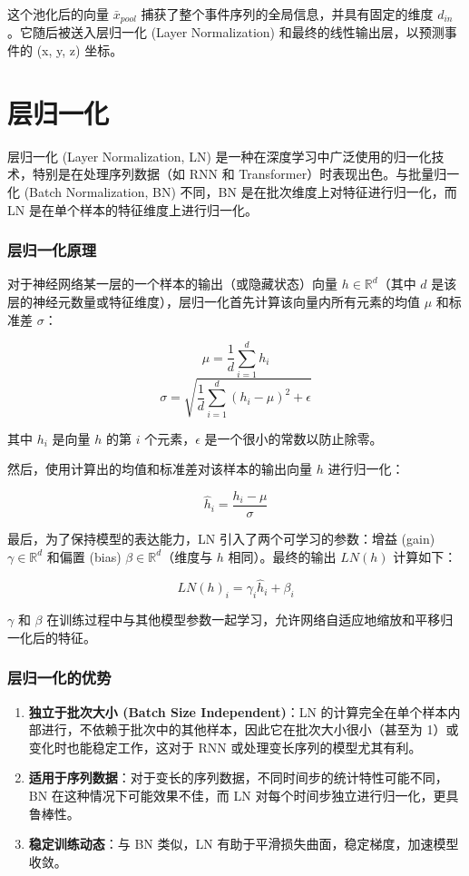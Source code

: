 这个池化后的向量 $\bar{x}_{pool}$ 捕获了整个事件序列的全局信息，并具有固定的维度 $d_{in}$。它随后被送入层归一化 (Layer Normalization) 和最终的线性输出层，以预测事件的 (x, y, z) 坐标。

\chapter{层归一化}

层归一化 (Layer Normalization, LN) 是一种在深度学习中广泛使用的归一化技术，特别是在处理序列数据（如 RNN 和 Transformer）时表现出色。与批量归一化 (Batch Normalization, BN) 不同，BN 是在批次维度上对特征进行归一化，而 LN 是在单个样本的特征维度上进行归一化。

\subsection{层归一化原理}

对于神经网络某一层的一个样本的输出（或隐藏状态）向量 $h \in \mathbb{R}^{d}$（其中 $d$ 是该层的神经元数量或特征维度），层归一化首先计算该向量内所有元素的均值 $\mu$ 和标准差 $\sigma$：

\[ \mu = \frac{1}{d} \sum_{i=1}^{d} h_i \]
\[ \sigma = \sqrt{\frac{1}{d} \sum_{i=1}^{d} (h_i - \mu)^2 + \epsilon} \]

其中 $h_i$ 是向量 $h$ 的第 $i$ 个元素，$\epsilon$ 是一个很小的常数以防止除零。

然后，使用计算出的均值和标准差对该样本的输出向量 $h$ 进行归一化：

\[ \hat{h}_i = \frac{h_i - \mu}{\sigma} \]

最后，为了保持模型的表达能力，LN 引入了两个可学习的参数：增益 (gain) $\gamma \in \mathbb{R}^{d}$ 和偏置 (bias) $\beta \in \mathbb{R}^{d}$（维度与 $h$ 相同）。最终的输出 $LN(h)$ 计算如下：

\[ LN(h)_i = \gamma_i \hat{h}_i + \beta_i \]

$\gamma$ 和 $\beta$ 在训练过程中与其他模型参数一起学习，允许网络自适应地缩放和平移归一化后的特征。

\subsection{层归一化的优势}

\begin{enumerate}
    \item \textbf{独立于批次大小 (Batch Size Independent)}：LN 的计算完全在单个样本内部进行，不依赖于批次中的其他样本，因此它在批次大小很小（甚至为 1）或变化时也能稳定工作，这对于 RNN 或处理变长序列的模型尤其有利。
    \item \textbf{适用于序列数据}：对于变长的序列数据，不同时间步的统计特性可能不同，BN 在这种情况下可能效果不佳，而 LN 对每个时间步独立进行归一化，更具鲁棒性。
    \item \textbf{稳定训练动态}：与 BN 类似，LN 有助于平滑损失曲面，稳定梯度，加速模型收敛。
\end{enumerate}

